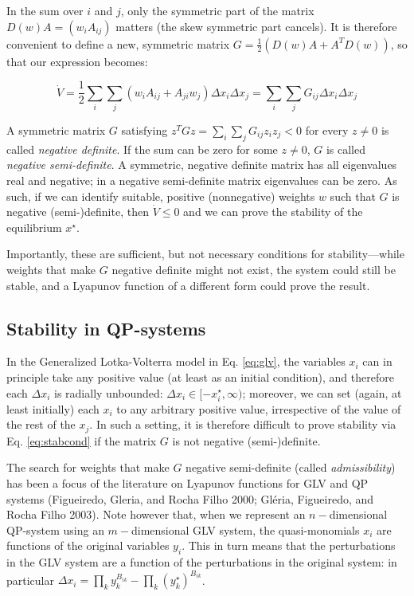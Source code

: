 \documentclass{article}
\begin{document}
In the sum over \(i\) and \(j\), only the symmetric part of the matrix
\(D(w) A = (w_i A_{ij})\) matters (the skew symmetric part cancels). It
is therefore convenient to define a new, symmetric matrix
\(G =\frac{1}{2} (D(w)A + A^T D(w))\), so that our expression becomes:

\begin{equation}
\label{eq:stabcond}
\dot{V} = \frac{1}{2}\sum_i \sum_j (w_i A_{ij} + A_{ji} w_j) \Delta x_i \Delta x_j = \sum_i \sum_j G_{ij} \Delta x_i \Delta x_j
\end{equation}

A symmetric matrix \(G\) satisfying
\(z^T G z = \sum_i \sum_j G_{ij} z_i z_j < 0\) for every \(z \neq 0\) is
called \emph{negative definite}. If the sum can be zero for some
\(z \neq 0\), \(G\) is called \emph{negative semi-definite}. A
symmetric, negative definite matrix has all eigenvalues real and
negative; in a negative semi-definite matrix eigenvalues can be zero. As
such, if we can identify suitable, positive (nonnegative) weights \(w\)
such that \(G\) is negative (semi-)definite, then \(\dot{V} \leq 0\) and
we can prove the stability of the equilibrium \(x^\star\).

Importantly, these are sufficient, but not necessary conditions for
stability---while weights that make \(G\) negative definite might not
exist, the system could still be stable, and a Lyapunov function of a
different form could prove the result.

\hypertarget{stability-in-qp-systems}{%
\subsection{Stability in QP-systems}\label{stability-in-qp-systems}}

In the Generalized Lotka-Volterra model in Eq. \ref{eq:glv}, the
variables \(x_i\) can in principle take any positive value (at least as
an initial condition), and therefore each \(\Delta x_i\) is radially
unbounded: \(\Delta x_i \in [-x_i^\star, \infty)\); moreover, we can set
(again, at least initially) each \(x_i\) to any arbitrary positive
value, irrespective of the value of the rest of the \(x_j\). In such a
setting, it is therefore difficult to prove stability via Eq.
\ref{eq:stabcond} if the matrix \(G\) is not negative (semi-)definite.

The search for weights that make \(G\) negative semi-definite (called
\emph{admissibility}) has been a focus of the literature on Lyapunov
functions for GLV and QP systems (Figueiredo, Gleria, and Rocha Filho
2000; Gléria, Figueiredo, and Rocha Filho 2003). Note however that, when
we represent an \(n-\)dimensional QP-system using an \(m-\)dimensional
GLV system, the quasi-monomials \(x_i\) are functions of the original
variables \(y_i\). This in turn means that the perturbations in the GLV
system are a function of the perturbations in the original system: in
particular
\(\Delta x_i = \prod_{k} y_k^{B_{ik}} - \prod_{k} (y_k^\star)^{B_{ik}}\).
\end{document}
